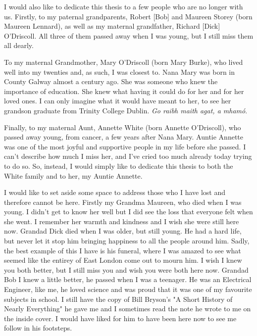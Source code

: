 \documentclass[a4paper,oneside,12pt]{book}
\numberwithin{equation}{chapter} %
\begin{document}
I would also like to dedicate this thesis to a few people who are no longer with us. Firstly, to my paternal grandparents, Robert [Bob] and Maureen Storey (born Maureen Lennard), as well as my maternal grandfather, Richard [Dick] O'Driscoll. All three of them passed away when I was young, but I still miss them all dearly. 

To my maternal Grandmother, Mary O'Driscoll (born Mary Burke), who lived well into my twenties and, as such, I was closest to. Nana Mary was born in County Galway almost a century ago. She was someone who knew the importance of education. She knew what having it could do for her and for her loved ones. I can only imagine what it would have meant to her, to see her grandson graduate from Trinity College Dublin. \textit{Go raibh maith agat, a mhamó}. 

Finally, to my maternal Aunt, Annette White (born Annette O'Driscoll), who passed away young, from cancer, a few years after Nana Mary. Auntie Annette was one of the most joyful and supportive people in my life before she passed.  I can't describe how much I miss her, and I've cried too much already today trying to do so. So, instead, I would simply like to dedicate this thesis to both the White family and to her, my Auntie Annette. %



\iffalse
I would like to set aside some space to address those who I have lost and therefore cannot be here. Firstly my Grandma Maureen, who died when I was young. I didn't get to know her well but I did see the loss that everyone felt when she went. I remember her warmth and kindness and I wish she were still here now. Grandad Dick died when I was older, but still young. He had a hard life, but never let it stop him bringing happiness to all the people around him. Sadly, the best example of this I have is his funeral, where I was amazed to see what seemed like the entirey of East London come out to mourn him. I wish I knew you both better, but I still miss you and wish you were both here now. Grandad Bob I knew a little better, he passed when I was a teenager. He was an Electrical Engineer, like me, he loved science and was proud that it was one of my favourite subjects in school. I still have the copy of Bill Bryson's "A Short History of Nearly Everything" he gave me and I sometimes read the note he wrote to me on the inside cover. I would have liked for him to have been here now to see me follow in his footsteps.
\end{document}
